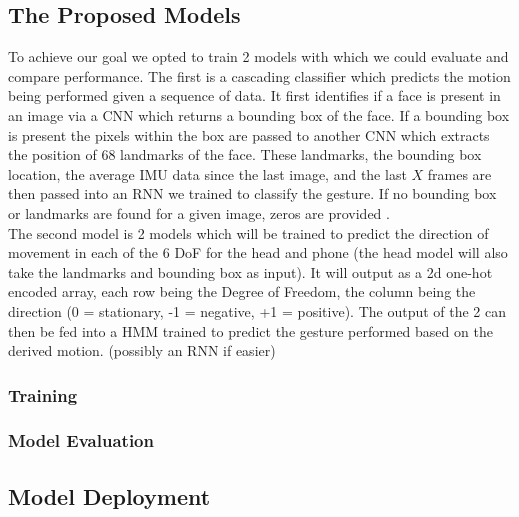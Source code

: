 \subsection{The Proposed Models} %
%
To achieve our goal we opted to train 2 models with which we could evaluate and compare performance.
The first is a cascading classifier which predicts the motion being performed given a sequence of data.
It first identifies if a face is present in an image via a CNN which returns a bounding box of the face\cite{yu2022yunet}. If a bounding box is present the pixels within the box are passed to another CNN which extracts the position of 68 landmarks of the face\cite{guobing2021headpose}.
These landmarks, the bounding box location, the average IMU data since the last image, and the last $X$ frames are then passed into an RNN we trained to classify the gesture.
If no bounding box or landmarks are found for a given image, zeros are provided .
\\
The second model is 2 models which will be trained to predict the direction of movement in each of the 6 DoF for the head and phone (the head model will also take the landmarks and bounding box as input).
It will output as a 2d one-hot encoded array, each row being the Degree of Freedom, the column being the direction (0 = stationary, -1 = negative, +1 = positive).
The output of the 2 can then be fed into a HMM trained to predict the gesture performed based on the derived motion. (possibly an RNN if easier)



\subsubsection{Training}


\subsubsection{Model Evaluation}

\subsection{Model Deployment}

